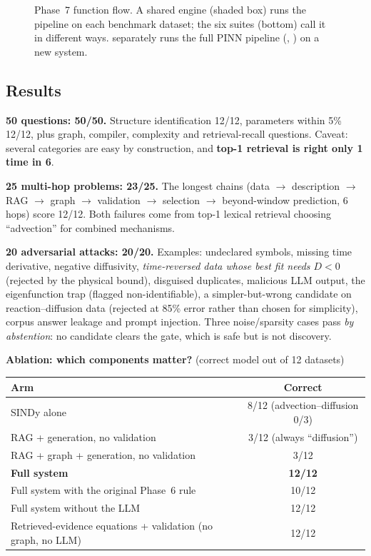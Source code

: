 \begin{figure}[!htb]
\centering

\pkglegend
\caption{Phase~7 function flow. A shared engine (shaded box) runs the pipeline on each benchmark dataset; the six
suites (bottom) call it in different ways.  separately runs the full PINN pipeline
(, ) on a new system.}
\label{fig:p7}
\end{figure}

\subsection*{Results}

\textbf{50 questions: 50/50.} Structure identification 12/12, parameters within 5\% 12/12, plus graph, compiler,
complexity and retrieval-recall questions. Caveat: several categories are easy by construction, and
\textbf{top-1 retrieval is right only 1 time in 6}.

\textbf{25 multi-hop problems: 23/25.} The longest chains (data $\to$ description $\to$ RAG $\to$ graph $\to$
validation $\to$ selection $\to$ beyond-window prediction, 6 hops) score 12/12. Both failures come from top-1
lexical retrieval choosing ``advection'' for combined mechanisms.

\textbf{20 adversarial attacks: 20/20.} Examples: undeclared symbols, missing time derivative, negative
diffusivity, \emph{time-reversed data whose best fit needs $D<0$} (rejected by the physical bound), disguised
duplicates, malicious LLM output, the eigenfunction trap (flagged non-identifiable), a simpler-but-wrong
candidate on reaction--diffusion data (rejected at 85\% error rather than chosen for simplicity), corpus answer
leakage and prompt injection. Three noise/sparsity cases pass \emph{by abstention}: no candidate clears the gate,
which is safe but is not discovery.

\textbf{Ablation: which components matter?} (correct model out of 12 datasets)
\begin{center}
\small
\begin{tabular}{@{}lc@{}}
\toprule
\textbf{Arm} & \textbf{Correct} \\ \midrule
SINDy alone & 8/12 (advection--diffusion 0/3) \\
RAG + generation, no validation & 3/12 (always ``diffusion'') \\
RAG + graph + generation, no validation & 3/12 \\
\textbf{Full system} & \textbf{12/12} \\
Full system with the original Phase~6 rule & 10/12 \\
Full system without the LLM & 12/12 \\
Retrieved-evidence equations + validation (no graph, no LLM) & 12/12 \\
\bottomrule
\end{tabular}
\end{center}

